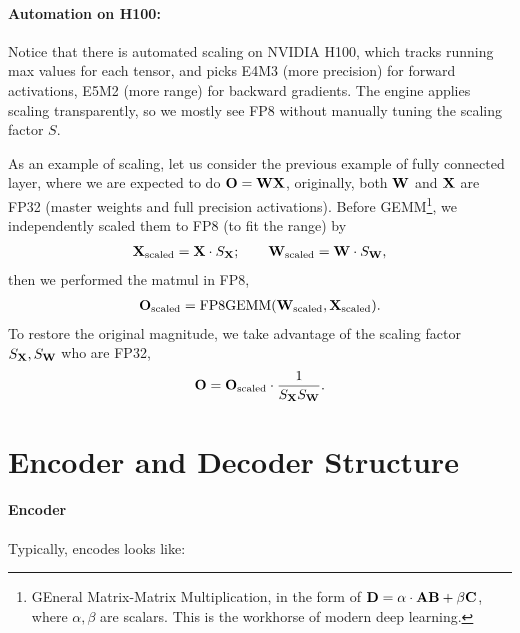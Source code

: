 \documentclass[11pt]{article}  %
\begin{document}
\paragraph{Automation on H100:} Notice that there is automated scaling on NVIDIA H100, which tracks running max values for each tensor, and picks E4M3 (more precision) for forward activations, E5M2 (more range) for backward gradients.
The engine applies scaling transparently, so we mostly see FP8 without manually tuning the scaling factor $S$.
 
As an example of scaling, let us consider the previous example of fully connected layer, where we are expected to do $\mathbf{O} = \mathbf{W}\mathbf{X}$, originally, both $\mathbf{W}$ and $\mathbf{X}$ are FP32 (master weights and full precision activations). 
Before GEMM\footnote{GEneral Matrix-Matrix Multiplication, in the form of $\mathbf{D} = \alpha\cdot\mathbf{A}\mathbf{B} + \beta\mathbf{C}$, where $\alpha, \beta$ are scalars. This is the workhorse of modern deep learning.}, we independently scaled them to FP8 (to fit the range) by 
\begin{align*}
  \mathbf{X}_{\text{scaled}} = \mathbf{X} \cdot S_{\mathbf{X}}; \qquad \mathbf{W}_{\text{scaled}} = \mathbf{W} \cdot S_{\mathbf{W}},
\end{align*}
then we performed the matmul in FP8, 
\begin{align*}
  \mathbf{O}_{\text{scaled}} = \text{FP8GEMM}(\mathbf{W}_{\text{scaled}}, \mathbf{X}_{\text{scaled}}).
\end{align*}
To restore the original magnitude, we take advantage of the scaling factor $S_{\mathbf{X}}, S_{\mathbf{W}}$ who are FP32,
\begin{align*}
  \mathbf{O} = \mathbf{O}_{\text{scaled}} \cdot \frac{1}{S_{\mathbf{X}}S_{\mathbf{W}}}.
\end{align*}





\section{Encoder and Decoder Structure}

\paragraph{Encoder}
Typically, encodes looks like:
\end{document}
